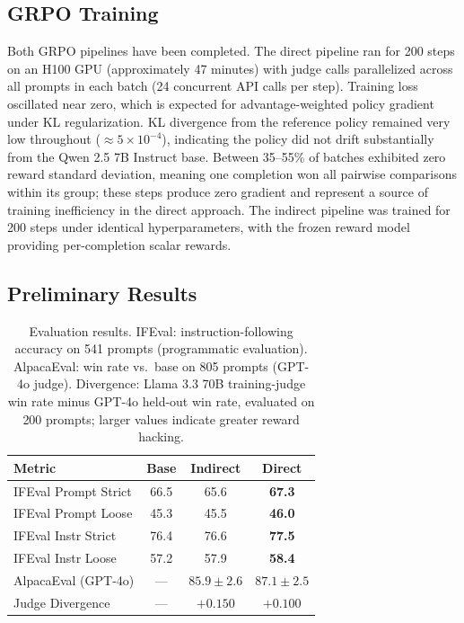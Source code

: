 \documentclass{article}
\begin{document}
\subsection{GRPO Training}

Both GRPO pipelines have been completed. The direct pipeline ran for 200 steps on an H100 GPU (approximately 47 minutes) with judge calls parallelized across all prompts in each batch (24 concurrent API calls per step). Training loss oscillated near zero, which is expected for advantage-weighted policy gradient under KL regularization. KL divergence from the reference policy remained very low throughout ($\approx 5 \times 10^{-4}$), indicating the policy did not drift substantially from the Qwen 2.5 7B Instruct base. Between 35--55\% of batches exhibited zero reward standard deviation, meaning one completion won all pairwise comparisons within its group; these steps produce zero gradient and represent a source of training inefficiency in the direct approach. The indirect pipeline was trained for 200 steps under identical hyperparameters, with the frozen reward model providing per-completion scalar rewards.

\subsection{Preliminary Results}

\begin{table}[ht]
\caption{Evaluation results. IFEval: instruction-following accuracy on 541 prompts (programmatic evaluation). AlpacaEval: win rate vs.\ base on 805 prompts (GPT-4o judge). Divergence: Llama 3.3 70B training-judge win rate minus GPT-4o held-out win rate, evaluated on 200 prompts; larger values indicate greater reward hacking.}
\label{tab:results}
\vskip 0.15in
\begin{center}
\begin{small}
\begin{tabular}{lccc}
\toprule
Metric & Base & Indirect & Direct \\
\midrule
IFEval Prompt Strict & 66.5 & 65.6 & \textbf{67.3} \\
IFEval Prompt Loose  & 45.3 & 45.5 & \textbf{46.0} \\
IFEval Instr Strict  & 76.4 & 76.6 & \textbf{77.5} \\
IFEval Instr Loose   & 57.2 & 57.9 & \textbf{58.4} \\
\midrule
AlpacaEval (GPT-4o)  & ---  & $85.9 \pm 2.6$ & $\mathbf{87.1 \pm 2.5}$ \\
Judge Divergence     & ---  & $+0.150$        & $\mathbf{+0.100}$ \\
\bottomrule
\end{tabular}
\end{small}
\end{center}
\vskip -0.1in
\end{table}
\end{document}
